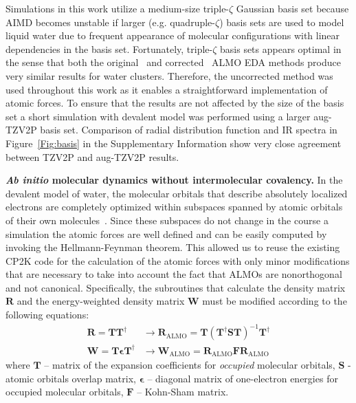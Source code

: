 \documentclass[aps,prl,reprint,amsmath,amssymb]{revtex4-1}
\begin{document}
Simulations in this work utilize a medium-size triple-$\zeta$ Gaussian basis set because AIMD becomes unstable if larger (e.g. quadruple-$\zeta$) basis sets are used to model liquid water due to frequent appearance of molecular configurations with linear dependencies in the basis set. 
Fortunately, triple-$\zeta$ basis sets appears optimal in the sense that both the original~\cite{khaliullin2007unravelling} and corrected~\cite{horn2015polarization} ALMO EDA methods produce very similar results for water clusters. 
Therefore, the uncorrected method was used throughout this work as it enables a straightforward implementation of atomic forces. 
To ensure that the results are not affected by the size of the basis set a short simulation with devalent model was performed using a larger aug-TZV2P basis set. Comparison of radial distribution function and IR spectra in Figure~\ref{Fig:basis} in the Supplementary Information show very close agreement between TZV2P and aug-TZV2P results. 


\textbf{\textit{Ab initio} molecular dynamics without intermolecular covalency.} In the devalent model of water, the molecular orbitals that describe absolutely localized electrons are completely optimized within subspaces spanned by atomic orbitals of their own molecules~\cite{khaliullin2006efficient}. Since these subspaces do not change in the course a simulation the atomic forces are well defined and can be easily computed by invoking the Hellmann-Feynman theorem. This allowed us to reuse the existing CP2K code for the calculation of the atomic forces with only minor modifications that are necessary to take into account the fact that ALMOs are nonorthogonal and not canonical. Specifically, the subroutines that calculate the density matrix $\mathbf{R}$ and the energy-weighted density matrix $\mathbf{W}$ must be modified according to the following equations:
%
\begin{equation}
\begin{split}
\mathbf{R} = \mathbf{T} \mathbf{T}^{\dagger} &\rightarrow \mathbf{R}_{\text{ALMO}} = \mathbf{T} (\mathbf{T}^{\dagger} \mathbf{S} \mathbf{T})^{-1}\mathbf{T}^{\dagger} \\
\mathbf{W} = \mathbf{T} \mathbf{\epsilon} \mathbf{T}^{\dagger} &\rightarrow \mathbf{W}_{\text{ALMO}}  = \mathbf{R}_{\text{ALMO}} \mathbf{F} \mathbf{R}_{\text{ALMO}}
\end{split}
\end{equation}
%
where $\mathbf{T}$ -- matrix of the expansion coefficients for \emph{occupied} molecular orbitals, $\mathbf{S}$ - atomic orbitals overlap matrix, $\mathbf{\epsilon}$ -- diagonal matrix of one-electron energies for occupied molecular orbitals, $\mathbf{F}$ -- Kohn-Sham matrix.
\end{document}
